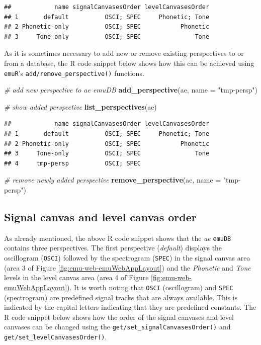 \documentclass[]{book}
\newenvironment{Shaded}{\begin{snugshade}}{\end{snugshade}}
\newcommand{\CommentTok}[1]{\textcolor[rgb]{0.56,0.35,0.01}{\textit{#1}}}
\newcommand{\DataTypeTok}[1]{\textcolor[rgb]{0.13,0.29,0.53}{#1}}
\newcommand{\KeywordTok}[1]{\textcolor[rgb]{0.13,0.29,0.53}{\textbf{#1}}}
\newcommand{\NormalTok}[1]{#1}
\newcommand{\StringTok}[1]{\textcolor[rgb]{0.31,0.60,0.02}{#1}}
\begin{document}
\begin{verbatim}
##            name signalCanvasesOrder levelCanvasesOrder
## 1       default          OSCI; SPEC     Phonetic; Tone
## 2 Phonetic-only          OSCI; SPEC           Phonetic
## 3     Tone-only          OSCI; SPEC               Tone
\end{verbatim}

As it is sometimes necessary to add new or remove existing perspectives to or from a database, the R code snippet below shows how this can be achieved using \texttt{emuR}'s \texttt{add/remove\_perspective()} functions.

\begin{Shaded}
\begin{Highlighting}[]
\CommentTok{# add new perspective to ae emuDB}
\KeywordTok{add_perspective}\NormalTok{(ae,}
                \DataTypeTok{name =} \StringTok{"tmp-persp"}\NormalTok{)}

\CommentTok{# show added perspective}
\KeywordTok{list_perspectives}\NormalTok{(ae)}
\end{Highlighting}
\end{Shaded}

\begin{verbatim}
##            name signalCanvasesOrder levelCanvasesOrder
## 1       default          OSCI; SPEC     Phonetic; Tone
## 2 Phonetic-only          OSCI; SPEC           Phonetic
## 3     Tone-only          OSCI; SPEC               Tone
## 4     tmp-persp          OSCI; SPEC
\end{verbatim}

\begin{Shaded}
\begin{Highlighting}[]
\CommentTok{# remove newly added perspective}
\KeywordTok{remove_perspective}\NormalTok{(ae,}
                   \DataTypeTok{name =} \StringTok{"tmp-persp"}\NormalTok{)}
\end{Highlighting}
\end{Shaded}

\hypertarget{signal-canvas-and-level-canvas-order}{%
\subsection{Signal canvas and level canvas order}\label{signal-canvas-and-level-canvas-order}}

As already mentioned, the above R code snippet shows that the \emph{ae} \texttt{emuDB} contains three perspectives. The first perspective (\emph{default}) displays the oscillogram (\texttt{OSCI}) followed by the spectrogram (\texttt{SPEC}) in the signal canvas area (area 3 of Figure \ref{fig:emu-web-emuWebAppLayout}) and the \emph{Phonetic} and \emph{Tone} levels in the level canvas area (area 4 of Figure \ref{fig:emu-web-emuWebAppLayout}). It is worth noting that \texttt{OSCI} (oscillogram) and \texttt{SPEC} (spectrogram) are predefined signal tracks that are always available. This is indicated by the capital letters indicating that they are predefined constants. The R code snippet below shows how the order of the signal canvases and level canvases can be changed using the \texttt{get/set\_signalCanvasesOrder()} and \texttt{get/set\_levelCanvasesOrder()}.
\end{document}
